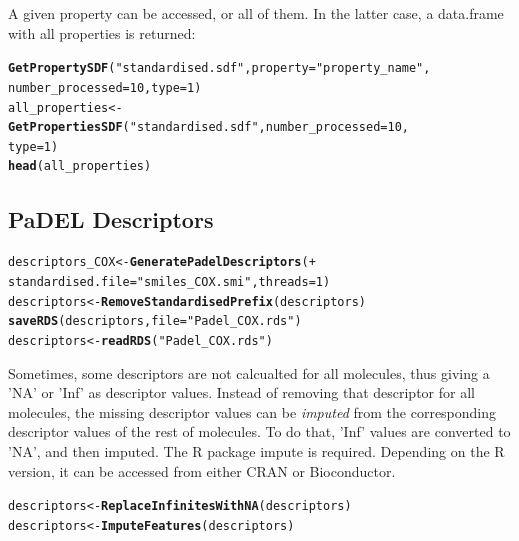 \documentclass[twoside,a4wide,12pt]{article}\usepackage[]{graphicx}\usepackage[]{color}
\makeatletter
\newcommand{\hlnum}[1]{\textcolor[rgb]{0.686,0.059,0.569}{#1}}%
\newcommand{\hlstr}[1]{\textcolor[rgb]{0.192,0.494,0.8}{#1}}%
\newcommand{\hlstd}[1]{\textcolor[rgb]{0.345,0.345,0.345}{#1}}%
\newcommand{\hlkwb}[1]{\textcolor[rgb]{0.69,0.353,0.396}{#1}}%
\newcommand{\hlkwc}[1]{\textcolor[rgb]{0.333,0.667,0.333}{#1}}%
\newcommand{\hlkwd}[1]{\textcolor[rgb]{0.737,0.353,0.396}{\textbf{#1}}}%
\newenvironment{kframe}{%
 \def\at@end@of@kframe{}%
 \ifinner\ifhmode%
  \def\at@end@of@kframe{\end{minipage}}%
  \begin{minipage}{\columnwidth}%
 \fi\fi%
 \def\FrameCommand##1{\hskip\@totalleftmargin \hskip-\fboxsep
 \colorbox{shadecolor}{##1}\hskip-\fboxsep
     \hskip-\linewidth \hskip-\@totalleftmargin \hskip\columnwidth}%
 \MakeFramed {\advance\hsize-\width
   \@totalleftmargin\z@ \linewidth\hsize
   \@setminipage}}%
 {\par\unskip\endMakeFramed%
 \at@end@of@kframe}
\newenvironment{knitrout}{}{} %
\makeatother
\begin{document}
A given property can be accessed, or all of them. In the latter case, a data.frame with all properties is returned:
\begin{knitrout}
\color{fgcolor}\begin{kframe}
\begin{alltt}
\hlkwd{GetPropertySDF}\hlstd{(}\hlstr{"standardised.sdf"}\hlstd{,} \hlkwc{property} \hlstd{=} \hlstr{"property_name"}\hlstd{,}
    \hlkwc{number_processed} \hlstd{=} \hlnum{10}\hlstd{,} \hlkwc{type} \hlstd{=} \hlnum{1}\hlstd{)}
\hlstd{all_properties} \hlkwb{<-} \hlkwd{GetPropertiesSDF}\hlstd{(}\hlstr{"standardised.sdf"}\hlstd{,} \hlkwc{number_processed} \hlstd{=} \hlnum{10}\hlstd{,}
    \hlkwc{type} \hlstd{=} \hlnum{1}\hlstd{)}
\hlkwd{head}\hlstd{(all_properties)}
\end{alltt}
\end{kframe}
\end{knitrout}


\subsection{PaDEL Descriptors}
\begin{knitrout}
\color{fgcolor}\begin{kframe}
\begin{alltt}
descriptors_COX <- \hlkwd{GeneratePadelDescriptors}( +
  standardised.file=\hlstr{"smiles_COX.smi"},threads = 1)
descriptors <- \hlkwd{RemoveStandardisedPrefix}(descriptors)
\hlkwd{saveRDS}(descriptors, file=\hlstr{"Padel_COX.rds"})
descriptors <- \hlkwd{readRDS}(\hlstr{"Padel_COX.rds"})
\end{alltt}
\end{kframe}
\end{knitrout}


Sometimes, some descriptors are not calcualted for all molecules, thus giving a 'NA' or 'Inf' as descriptor values.
Instead of removing that descriptor for all molecules, the missing descriptor values can be {\it imputed} from the corresponding descriptor values of the rest of molecules.
To do that, 'Inf' values are converted to 'NA', and then imputed. 
The R package impute is required. Depending on the R version, it can be accessed from either CRAN or Bioconductor.

\begin{knitrout}
\color{fgcolor}\begin{kframe}
\begin{alltt}
\hlstd{descriptors} \hlkwb{<-} \hlkwd{ReplaceInfinitesWithNA}\hlstd{(descriptors)}
\hlstd{descriptors} \hlkwb{<-} \hlkwd{ImputeFeatures}\hlstd{(descriptors)}
\end{alltt}
\end{kframe}
\end{knitrout}
\end{document}
